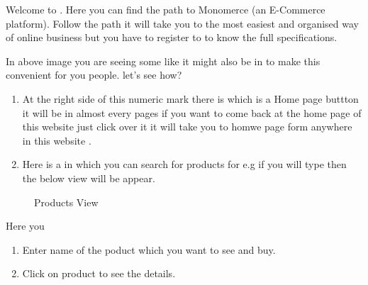 \documentclass[a4paper,10pt,english]{report}
\begin{document}
        \clearpage
        \tableofcontents
        \listoffigures
        \listoftables
        \clearpage

        
\pagestyle{plain}
 
\pagestyle{normal}
\label{\detokenize{index::doc}}


\begin{figure}[htbp]
\centering

\noindent{}
\end{figure}

Welcome to . Here you can find the path to Monomerce (an E-Commerce platform).
Follow the path it will take you to the most easiest and organised way of online business but you have to register to  to know the full specifications.

In above image you are seeing some  like  it might also be in  to make this convenient for you people. let’s see how?
\begin{enumerate}
\def\theenumi{\arabic{enumi}}
\def\labelenumi{\theenumi .}
\makeatletter\def\p@enumii{\p@enumi \theenumi .}\makeatother
\item {} 
At the right side of this numeric mark there is  which is a Home page buttton it will be in almost every pages if you want to come back at the home page of this website just click over it it will take you to homwe page form anywhere in this website .

\item {} 
Here is a  in which you can search for products for e.g if you will type  then the below view will be appear.

\end{enumerate}

\begin{figure}[htbp]
\centering
\capstart

\noindent{}
\caption{Products View}\label{\detokenize{index:id12}}\label{\detokenize{index:id2}}\end{figure}

Here you
\begin{enumerate}
\def\theenumi{\arabic{enumi}}
\def\labelenumi{\theenumi .}
\makeatletter\def\p@enumii{\p@enumi \theenumi .}\makeatother
\item {} 
Enter name of the poduct which you want to see and buy.

\item {} 
Click on product to see the details.

\end{enumerate}
\end{document}
